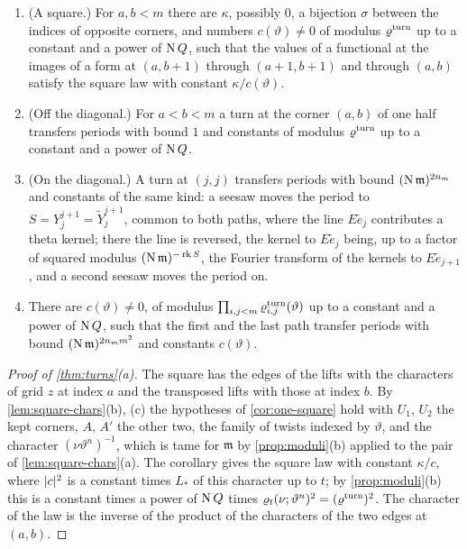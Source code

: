 \begin{theorem}\label{thm:turns}
\begin{enumerate}[label=\textup{(\alph*)}]
\item (A square.) For $a,b<m$ there are $\kappa$, possibly $0$, a bijection $\sigma$ between the indices of opposite corners, and numbers $c(\vartheta)\ne0$ of modulus $\varrho^{\rm turn}$ up to a constant and a power of $\operatorname{N} Q$, such
that the values of a functional at the images of a form at $(a,b+1)$ through $(a+1,b+1)$ and through $(a,b)$ satisfy the square law with constant $\kappa/c(\vartheta)$.
\item (Off the diagonal.) For $a<b<m$ a turn at the corner $(a,b)$ of one half transfers periods with bound $1$ and constants of modulus $\varrho^{\rm turn}$ up to a constant and a power of $\operatorname{N} Q$.
\item (On the diagonal.) A turn at $(j,j)$ transfers periods with bound $(\operatorname{N}\mathfrak m)^{2n_m}$ and constants of the same kind: a seesaw moves the period to $S=Y^{j+1}_j=\tilde Y^{j+1}_j$, common to both paths, where
the line $E\tilde e_j$ contributes a theta kernel; there the line is reversed, the kernel to $E\tilde e_j$ being, up to a factor of squared modulus $(\operatorname{N}\mathfrak m)^{-\operatorname{rk}S}$, the Fourier transform of the kernels to
$E\tilde e_{j+1}$, and a second seesaw moves the period on.
\item There are $c(\vartheta)\ne0$, of modulus $\prod_{i,j<m}\varrho^{\rm turn}_{i,j}(\vartheta)$ up to a constant and a power of $\operatorname{N} Q$, such that the first and the last path transfer periods with bound $(\operatorname{N}\mathfrak m)^{2n_mm^2}$ and
constants $c(\vartheta)$.
\end{enumerate}
\end{theorem}

\begin{proof}[Proof of \cref{thm:turns}(a)]
The square has the edges of the lifts with the characters of grid $z$ at index $a$ and the transposed lifts with those at index $b$. By \cref{lem:square-chars}(b), (c) the hypotheses of \cref{cor:one-square} hold with $U_1$, $U_2$
the kept corners, $A$, $A'$ the other two, the family of twists indexed by $\vartheta$, and the character $(\nu\vartheta^n)^{-1}$, which is tame for $\mathfrak m$ by \cref{prop:moduli}(b) applied to the pair of \cref{lem:square-chars}(a). The
corollary gives the square law with constant $\kappa/c$, where $\lvert c\rvert^2$ is a constant times $L_*$ of this character up to $t$; by \cref{prop:moduli}(b) this is a constant times a power of $\operatorname{N} Q$ times
$\varrho_t(\nu;\vartheta^n)^2=(\varrho^{\rm turn})^2$. The character of the law is the inverse of the product of the characters of the two edges at $(a,b)$.
\end{proof}

